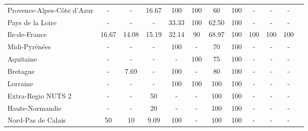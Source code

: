 \begin{table}[H]
\begin{tabularx}{\textwidth}{Xccccccccccc}
            Provence-Alpes-Côte d’Azur & - & - & 16.67 & 100 & 100 & 60 & 100 & - & - & - \\
            Pays de la Loire & - & - & - & 33.33 & 100 & 62.50 & 100 & - & - & - \\
            Ile-de-France & 16.67 & 14.08 & 15.19 & 32.14 & 90 & 68.97 & 100 & 100 & 100 & 100 \\
            Midi-Pyrénées & - & - & - & 100 & - & 70 & 100 & - & - & - \\
            Aquitaine & - & - & - & - & 100 & 75 & 100 & - & - & - \\
            Bretagne & - & 7.69 & - & 100 & - & 80 & 100 & - & - & - \\
            Lorraine & - & - & - & 100 & 100 & 100 & 100 & - & - & - \\
            Extra-Regio NUTS 2 & - & - & 50 & - & - & 100 & 100 & - & - & - \\
            Haute-Normandie  & - & - & 20 & - & - & 100 & 100 & - & - & - \\
            Nord-Pas de Calais & 50 & 10 & 9.09 & 100 & - & 100 & 100 & - & - & - \\
        \bottomrule
    \end{tabularx}
\end{table}
    